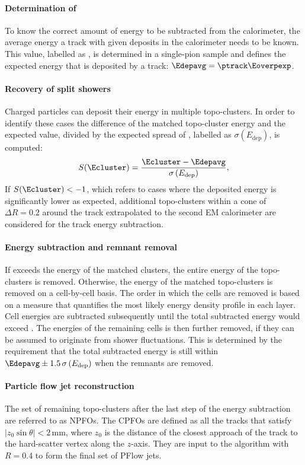 \paragraph{Determination of \Eoverpexp} To know the correct amount of energy to be subtracted from the calorimeter, the average energy a track with given \pT deposits in the calorimeter needs to be known. This value, labelled as \Eoverpexp, is determined in a single-pion sample and defines the expected energy that is deposited by a track: $\Edepavg = \ptrack \Eoverpexp$.

\paragraph{Recovery of split showers} Charged particles can deposit their energy in multiple topo-clusters. In order to identify these cases the difference of the matched topo-cluster energy and the expected value, divided by the expected spread of \Edepavg, labelled as $\sigma \left(E_{\text{dep}}\right)$, is computed:
\begin{equation}
    S(\Ecluster) = \frac{ \Ecluster - \Edepavg}{\sigma \left(E_{\text{dep}}\right)},
\end{equation}
If $S(\Ecluster)  < -1$, which refers to cases where the deposited energy is significantly lower as expected, additional topo-clusters within a cone of $\Delta R = 0.2$ around the track extrapolated to the second EM calorimeter are considered for the track energy subtraction.

\paragraph{Energy subtraction and remnant removal} If \Edepavg exceeds the energy of the matched clusters, the entire energy of the topo-clusters is removed. Otherwise, the energy of the matched topo-clusters is removed on a cell-by-cell basis. The order in which the cells are removed is based on a measure that quantifies the most likely energy density profile in each layer. Cell energies are subtracted subsequently until the total subtracted energy would exceed \Edepavg. The energies of the remaining cells is then further removed, if they can be assumed to originate from shower fluctuations. This is determined by the requirement that the total subtracted energy is still within $\Edepavg \pm 1.5\,\sigma \left(E_{\text{dep}}\right)$ when the remnants are removed.

\paragraph{Particle flow jet reconstruction}
The set of remaining topo-clusters after the last step of the energy subtraction are referred to as NPFOs. The CPFOs are defined as all the tracks that satisfy $|z_0 \sin \theta| < 2$\,mm, where $z_0$ is the distance of the closest approach of the track to the hard-scatter vertex along the $z$-axis.
They are input to the \antikt algorithm with $R=0.4$ to form the final set of PFlow jets.

